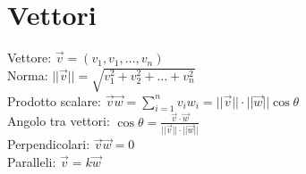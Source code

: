 \section{Vettori}
Vettore: $\overrightarrow{v} = (v_1, v_1, \ldots, v_n)$ \\
Norma: $||\vec{v}|| = \sqrt{v_1^2 + v_2^2 + ... + v_n^2}$ \\
Prodotto scalare: $\overrightarrow{v} \overrightarrow{w} = \sum_{i=1}^n v_i w_i = ||\overrightarrow{v}|| \cdot ||\overrightarrow{w}|| \cos \theta$ \\
Angolo tra vettori: $\cos{\theta} = \frac{\overrightarrow{v} \cdot \overrightarrow{w}}{||\overrightarrow{v}|| \cdot ||\overrightarrow{w}||}$ \\
Perpendicolari: $\overrightarrow{v} \overrightarrow{w} = 0$ \\
Paralleli: $\overrightarrow{v} = k\overrightarrow{w}$ \\